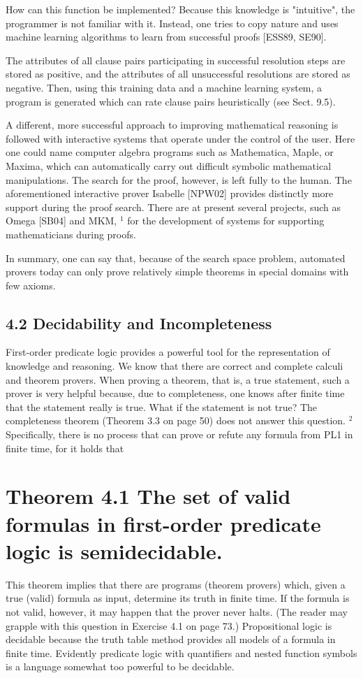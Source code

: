 \documentclass[10pt]{article}
\begin{document}
How can this function be implemented? Because this knowledge is "intuitive", the programmer is not familiar with it. Instead, one tries to copy nature and uses machine learning algorithms to learn from successful proofs [ESS89, SE90].

The attributes of all clause pairs participating in successful resolution steps are stored as positive, and the attributes of all unsuccessful resolutions are stored as negative. Then, using this training data and a machine learning system, a program is generated which can rate clause pairs heuristically (see Sect. 9.5).

A different, more successful approach to improving mathematical reasoning is followed with interactive systems that operate under the control of the user. Here one could name computer algebra programs such as Mathematica, Maple, or Maxima, which can automatically carry out difficult symbolic mathematical manipulations. The search for the proof, however, is left fully to the human. The aforementioned interactive prover Isabelle [NPW02] provides distinctly more support during the proof search. There are at present several projects, such as Omega [SB04] and MKM, ${ }^{1}$ for the development of systems for supporting mathematicians during proofs.

In summary, one can say that, because of the search space problem, automated provers today can only prove relatively simple theorems in special domains with few axioms.

\subsection*{4.2 Decidability and Incompleteness}
First-order predicate logic provides a powerful tool for the representation of knowledge and reasoning. We know that there are correct and complete calculi and theorem provers. When proving a theorem, that is, a true statement, such a prover is very helpful because, due to completeness, one knows after finite time that the statement really is true. What if the statement is not true? The completeness theorem (Theorem 3.3 on page 50) does not answer this question. ${ }^{2}$ Specifically, there is no process that can prove or refute any formula from PL1 in finite time, for it holds that

\section*{Theorem 4.1 The set of valid formulas in first-order predicate logic is semidecidable.}
This theorem implies that there are programs (theorem provers) which, given a true (valid) formula as input, determine its truth in finite time. If the formula is not valid, however, it may happen that the prover never halts. (The reader may grapple with this question in Exercise 4.1 on page 73.) Propositional logic is decidable because the truth table method provides all models of a formula in finite time. Evidently predicate logic with quantifiers and nested function symbols is a language somewhat too powerful to be decidable.
\end{document}
